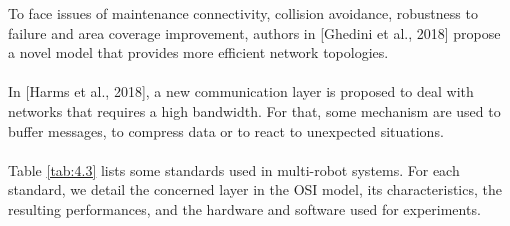 \documentclass[11pt,openany]{book}
\begin{document}
To face issues of maintenance connectivity, collision avoidance, robustness to failure and area coverage improvement, authors in [Ghedini et al., 2018] propose a novel model that provides more eﬃcient network topologies.\\\\
In [Harms et al., 2018], a new communication layer is proposed to deal with networks that requires a high bandwidth. For that, some mechanism are used to buﬀer messages, to compress data or to react to unexpected situations.\\\\
Table \ref{tab:4.3} lists some standards used in multi-robot systems. For each standard, we detail the concerned layer in the OSI model, its characteristics, the resulting performances, and the hardware and software used for experiments.
\end{document}
